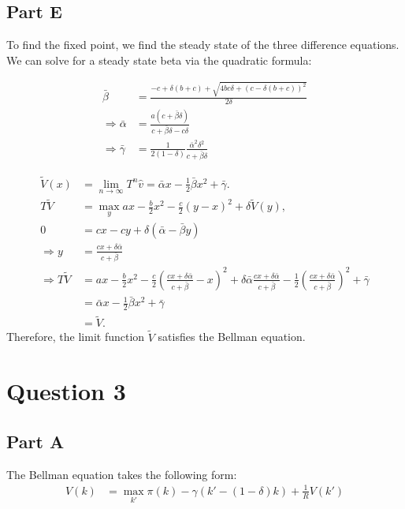 \documentclass[11pt]{article} %
\begin{document}
\subsection{Part E}
To find the fixed point, we find the steady state of the three difference equations. We can solve for a steady state beta via the quadratic formula:

\begin{align*}
\bar{\beta} &= \frac{-c + \delta(b+c) + \sqrt{4bc\delta + (c - \delta (b+c))^2}}{2\delta}\\
\Rightarrow \bar{\alpha} &= \frac{a(c+\bar{\beta}\delta)}{c+\bar{\beta}\delta - c \delta}\\
\Rightarrow \bar{\gamma} &= \frac{1}{2(1-\delta)}\frac{\bar{\alpha}^2\delta^2}{c+\bar{\beta}\delta}
\end{align*}


\begin{align*}
\tilde{V}(x) &= \lim_{n\rightarrow \infty} T^n \hat{v} = \bar{\alpha} x - \frac{1}{2}\bar{\beta}x^2 + \bar{\gamma}.\\
T\tilde{V} &= \max_{y} ax - \frac{b}{2}x^2 - \frac{c}{2}(y-x)^2 + \delta \tilde{V}(y),\\
0&=cx-cy +\delta(\bar{\alpha} - \bar{\beta}y) \\
\Rightarrow y &= \frac{cx+\delta \bar{\alpha}}{c+\bar{\beta}}\\
\Rightarrow T\tilde{V} &= ax - \frac{b}{2}x^2 - \frac{c}{2}\left(\frac{cx+\delta \bar{\alpha}}{c+\bar{\beta}}-x\right)^2 + \delta \bar{\alpha} \frac{cx+\delta \bar{\alpha}}{c+\bar{\beta}} - \frac{1}{2}\left(\frac{cx+\delta \bar{\alpha}}{c+\bar{\beta}}\right)^2 + \bar{\gamma}\\
&= \bar{\alpha} x - \frac{1}{2}\bar{\beta}x^2 + \bar{\gamma}\\
&= \tilde{V}.
\end{align*}
Therefore, the limit function $\tilde{V}$ satisfies the Bellman equation.
\section{Question 3}
\subsection{Part A}
The Bellman equation takes the following form:
\begin{align*}
V(k) &= \max_{k'} \pi (k) - \gamma(k' - (1-\delta)k) + \frac{1}{R}V(k')
\end{align*}
\end{document}
